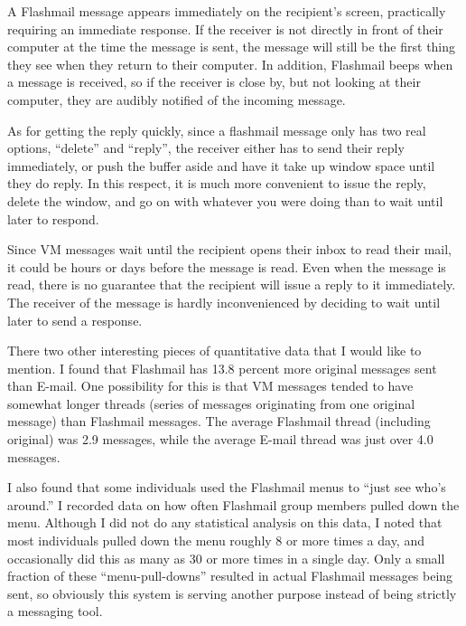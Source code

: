 \begin{itemize}
  A Flashmail message appears immediately on the recipient's screen,
  practically requiring an immediate response.  If the receiver is not
  directly in front of their computer at the time the message is sent, the
  message will still be the first thing they see when they return to their
  computer.  In addition, Flashmail beeps when a message is received, so if
  the receiver is close by, but not looking at their computer, they are
  audibly notified of the incoming message.

  As for getting the reply quickly, since a flashmail message only has two
  real options, ``delete'' and ``reply'', the receiver either has to send
  their reply immediately, or push the buffer aside and have it take up
  window space until they do reply.  In this respect, it is much more
  convenient to issue the reply, delete the window, and go on with whatever
  you were doing than to wait until later to respond.

  Since VM messages wait until the recipient opens their inbox to read
  their mail, it could be hours or days before the message is read.  Even
  when the message is read, there is no guarantee that the recipient will
  issue a reply to it immediately. The receiver of the message is hardly
  inconvenienced by deciding to wait until later to send a response.

\end{itemize}

There two other interesting pieces of quantitative data that I would like
to mention.  I found that Flashmail has 13.8 percent more original messages
sent than E-mail. One possibility for this is that VM messages tended to
have somewhat longer threads (series of messages originating from one
original message) than Flashmail messages.  The average Flashmail thread
(including original) was 2.9 messages, while the average E-mail thread was
just over 4.0 messages. 
   
I also found that some individuals used the Flashmail menus to ``just see
who's around.''  I recorded data on how often Flashmail group members
pulled down the menu.  Although I did not do any statistical analysis on
this data, I noted that most individuals pulled down the menu roughly 8 or
more times a day, and occasionally did this as many as 30 or more times in
a single day.  Only a small fraction of these ``menu-pull-downs'' resulted
in actual Flashmail messages being sent, so obviously this system is
serving another purpose instead of being strictly a messaging tool.

